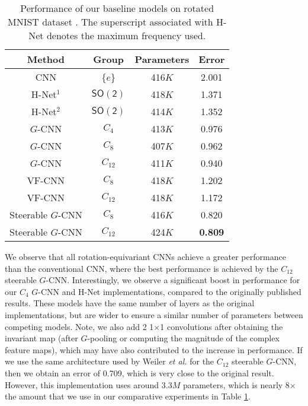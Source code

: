 \documentclass[journal]{IEEEtran}
\newcommand\SOrth{\mathsf{SO(2)}}
\begin{document}
{	\begin{table}[h]
	\begin{center}
		\caption{Performance of our baseline models on rotated MNIST dataset \cite{larochelle2007empirical}. The superscript associated with H-Net denotes the maximum frequency used.}
		\label{dup1 table:comparative_rotmnist}
		\setlength{\tabcolsep}{3pt} \renewcommand{\arraystretch}{1.0} \begin{tabular}{c|c|c|c}
			 \textbf{Method} & \textbf{Group}  & \textbf{Parameters}  &  \textbf{Error}  \\
			\midrule
            CNN & \{$e$\} & 416$K$  & 2.001 \\
            H-Net$^1$ \cite{worrall2017harmonic} & $\SOrth$ & 418$K$  & 1.371   \\
            H-Net$^2$ \cite{worrall2017harmonic} & $\SOrth$ & 414$K$  & 1.352 \\
            $G$-CNN \cite{cohen2016group} & $C_{4}$ & 413$K$  & 0.976   \\
            $G$-CNN \cite{bekkers2018roto,lafarge2020roto} & $C_{8}$ & 407$K$  & 0.962   \\
            $G$-CNN \cite{bekkers2018roto,lafarge2020roto} & $C_{12}$ & 411$K$  & 0.940   \\
            VF-CNN \cite{marcos2017rotation} & $C_{8}$ & 418$K$ & 1.202   \\
            VF-CNN \cite{marcos2017rotation} & $C_{12}$ & 418$K$ & 1.172   \\
            Steerable $G$-CNN \cite{weiler2018learning} & $C_{8}$ & 416$K$ & 0.820  \\
            Steerable $G$-CNN \cite{weiler2018learning} & $C_{12}$ & 424$K$ & \textbf{0.809}  \\
			\bottomrule
		\end{tabular}
	\end{center}
	\end{table}	
	
	We observe that all rotation-equivariant CNNs achieve a greater performance than the conventional CNN, where the best performance is achieved by the $C_{12}$ steerable $G$-CNN. Interestingly, we observe a significant boost in performance for our $C_4$ $G$-CNN and H-Net implementations, compared to the originally published results. These models have the same number of layers as the original implementations, but are wider to ensure a similar number of parameters between competing models. Note, we also add 2 1$\times$1 convolutions after obtaining the invariant map (after $G$-pooling or computing the magnitude of the complex feature maps), which may have also contributed to the increase in performance. If we use the same architecture used by Weiler \textit{et al.} for the $C_{12}$ steerable $G$-CNN, then we obtain an error of 0.709, which is very close to the original result. However, this implementation uses around 3.3$M$ parameters, which is nearly 8$\times$ the amount that we use in our comparative experiments in Table \ref{dup1 table:comparative_rotmnist}.
	
}
\end{document}
